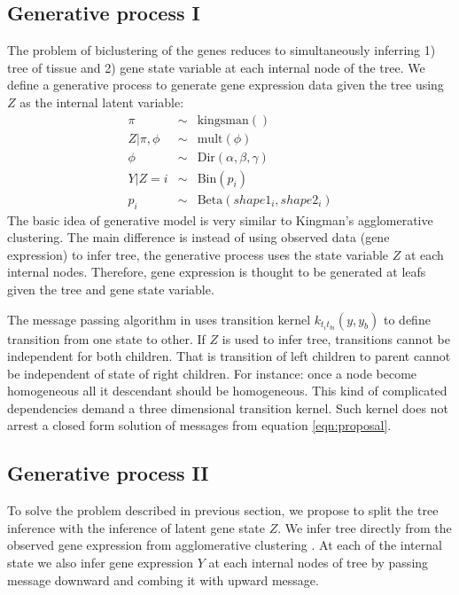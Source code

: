 \documentclass{article}
\begin{document}
\subsection{Generative process I}
The problem of biclustering of the genes 
reduces to simultaneously inferring 1) tree of tissue and 2) gene state variable at each internal node of the tree.
We define a generative process to generate gene expression data given the tree using $Z$ as the internal latent variable:
\begin{eqnarray}
	\pi &\sim& \text{kingsman}() \nonumber\\
	Z|\pi,\phi &\sim& \text{mult}(\phi) \nonumber \\
	\phi &\sim&  \text{Dir}(\alpha,\beta,\gamma) \nonumber\\
	Y|Z = i &\sim& \text{Bin}(p_i) \nonumber \\
	p_i &\sim&  \text{Beta}(shape1_i,  shape2_i)
	\label{eqn:gen1}
\end{eqnarray}
The basic idea of generative model is very similar to Kingman's agglomerative clustering. The main difference is instead of using 
observed data (gene expression) to infer tree, the generative process uses the state variable $Z$ at each internal nodes. 
Therefore, gene expression is thought to be generated at leafs given the tree and gene state variable.


The message passing algorithm in \cite{teh2008bayesian} uses transition kernel $ k_{t_i t_{bi}}(y,y_b)$
to define transition from one state to other. If 
$Z$ is used to infer tree, transitions cannot be independent for both children. That is transition of left children to
parent cannot be independent of state of right children. For instance:  once a node become homogeneous all it descendant 
should be homogeneous. This kind of complicated dependencies demand a three dimensional transition kernel. Such kernel does not
arrest a closed form solution of messages from equation \ref{eqn:proposal}.

\subsection{Generative process II}
To solve the problem described in previous section, we propose to split the tree inference with the inference of latent 
gene state $Z$. We infer tree directly from the observed gene expression from agglomerative clustering \cite{teh2008bayesian}.
At each of the internal state we also infer gene expression $Y$ at each internal nodes of tree by passing message downward and 
combing it with upward message. 
\end{document}
